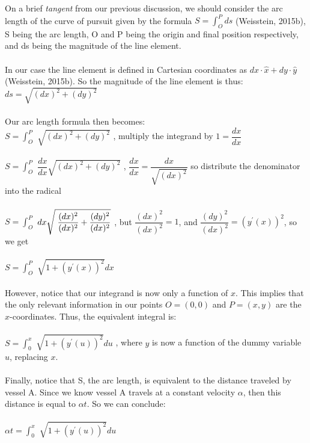 \documentclass[12pt]{article}
\begin{document}
	\indent\indent On a brief \textit{tangent} from our previous discussion, we should consider the arc length of the curve of pursuit given by the formula $S=\int^P_O ds$ (Weisstein, 2015b), S being the arc length, O and P being the origin and final position respectively, and ds being the magnitude of the line element.
	\\
	\\
	\indent In our case the line element is defined in Cartesian coordinates as $dx\cdot\hat{x} + dy\cdot\hat{y}$ (Weisstein, 2015b). So the magnitude of the line element is thus: $ds=\sqrt{(dx)^{2}+(dy)^{2}}$
	\\
	\\
	\indent Our arc length formula then becomes:
	\\
	$S=${\Large $\int^P_O$} $\sqrt{(dx)^{2}+(dy)^{2}}$ \hspace{1cm} , multiply the integrand by $1=\dfrac{dx}{dx}$
	\\
	\\
	$S=${\Large $\int^P_O$} $ \dfrac{dx}{dx}\sqrt{(dx)^{2}+(dy)^{2}}$ \hspace{0.5cm} , $\dfrac{dx}{dx}=\dfrac{dx}{\sqrt{(dx)^{2}}}$ \hspace{2mm} so distribute the denominator into the radical
	\\
	\\
	$S=${\Large $\int^P_O$} $ dx\sqrt{ \hspace{1mm}\dfrac{(dx)^{2}}{(dx)^{2}} + \dfrac{(dy)^{2}}{(dx)^{2}}}$\hspace{0.45cm} , but $\dfrac{(dx)^{2}}{(dx)^{2}}=1$, and $\dfrac{(dy)^{2}}{(dx)^{2}}=(y^{\prime}(x))^{2}$, so we get  
	\\
	\\
	$S=${\Large $\int^P_O$} $ \sqrt{ 1 + (y^{\prime}(x))^{2}}dx$
	\\
	\\
	\indent However, notice that our integrand is now only a function of $x$. This implies that the only relevant information in our points $O=(0,0)$ and $P=(x,y)$ are the $x$-coordinates. Thus, the equivalent integral is:
	\\
	\\
	$S=${\Large $\int^x_0$} $ \sqrt{ 1 + (y^{\prime}(u))^{2}}du$ \hspace{1cm}, where $y$ is now a function of the dummy variable $u$, replacing $x$.
	\\
	\\
	\indent Finally, notice that S, the arc length, is equivalent to the distance traveled by vessel A. Since we know vessel A travels at a constant velocity $\alpha$, then this distance is equal to $\alpha t$. So we can conclude: 
	\\
	\\
	$\alpha t=${\Large $\int^x_0$} $ \sqrt{ 1 + (y^{\prime}(u))^{2}}du$
	
\end{document}
